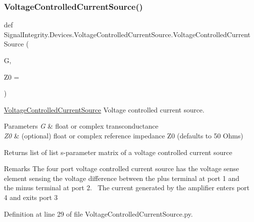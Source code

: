 \subsubsection{\texorpdfstring{Voltage\+Controlled\+Current\+Source()}{VoltageControlledCurrentSource()}}
{\footnotesize\ttfamily def Signal\+Integrity.\+Devices.\+Voltage\+Controlled\+Current\+Source.\+Voltage\+Controlled\+Current\+Source (\begin{DoxyParamCaption}\item[{}]{G,  }\item[{}]{Z0 = {} }\end{DoxyParamCaption})}



\hyperlink{namespaceSignalIntegrity_1_1Devices_1_1VoltageControlledCurrentSource}{Voltage\+Controlled\+Current\+Source} Voltage controlled current source. 


\begin{DoxyParams}{Parameters}
{\em G} & float or complex transconductance \\
\hline
{\em Z0} & (optional) float or complex reference impedance Z0 (defaults to 50 Ohms) \\
\hline
\end{DoxyParams}
\begin{DoxyReturn}{Returns}
list of list s-\/parameter matrix of a voltage controlled current source 
\end{DoxyReturn}
\begin{DoxyRemark}{Remarks}
The four port voltage controlled current source has the voltage sense element sensing the voltage difference between the plus terminal at port 1 and the minus terminal at port 2.~\newline
 The current generated by the amplifier enters port 4 and exits port 3 
\end{DoxyRemark}


Definition at line 29 of file Voltage\+Controlled\+Current\+Source.\+py.

